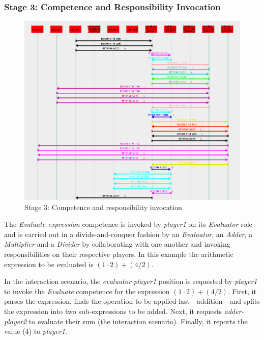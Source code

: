 \subsubsection*{Stage 3: Competence and Responsibility Invocation}

\begin{figure}[H]
	\centering
	\includegraphics[width=\textwidth]{images/examples/example2-stage3.png}
	\caption{Stage 3: Competence and responsibility invocation}
	\label{figure:example2-stage3}
\end{figure}

The \textit{Evaluate expression} competence is invoked by \textit{player1} on its \textit{Evaluator} role and is carried out in a divide-and-conquer fashion by an \textit{Evaluator}, an \textit{Adder}, a \textit{Multiplier} and a \textit{Divider} by collaborating with one another and invoking responsibilities on their respective players.
In this example the arithmetic expression to be evaluated is $(1\cdot2)+(4/2)$.

In the {} interaction scenario, the \textit{evaluator-player1} position is requested by \textit{player1} to invoke the \textit{Evaluate} competence for the expression $(1\cdot2)+(4/2)$.
First, it parses the expression, finds the operation to be applied last---addition---and splits the expression into two sub-expressions to be added.
Next, it requests \textit{adder-player2} to evaluate their sum (the {} interaction scenario).
Finally, it reports the value (4) to \textit{player1}.

